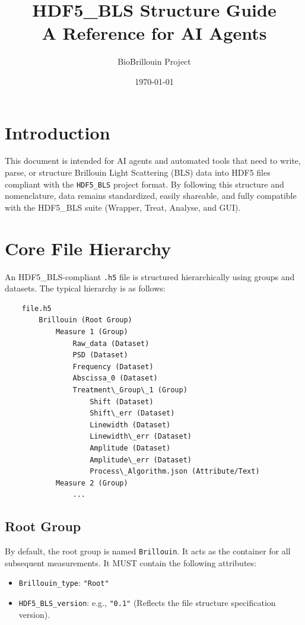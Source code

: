 \documentclass{article}
\title{HDF5\_BLS Structure Guide \\ \large A Reference for AI Agents}
\author{BioBrillouin Project}
\date{\today}
\begin{document}
\maketitle

\section{Introduction}
This document is intended for AI agents and automated tools that need to write, parse, or structure Brillouin Light Scattering (BLS) data into HDF5 files compliant with the \texttt{HDF5\_BLS} project format. By following this structure and nomenclature, data remains standardized, easily shareable, and fully compatible with the HDF5\_BLS suite (Wrapper, Treat, Analyse, and GUI).

\section{Core File Hierarchy}
An HDF5\_BLS-compliant \texttt{.h5} file is structured hierarchically using groups and datasets. The typical hierarchy is as follows:

\begin{verbatim}
    file.h5
        Brillouin (Root Group)
            Measure 1 (Group)
                Raw_data (Dataset)
                PSD (Dataset)
                Frequency (Dataset)
                Abscissa_0 (Dataset)
                Treatment\_Group\_1 (Group)
                    Shift (Dataset)
                    Shift\_err (Dataset)
                    Linewidth (Dataset)
                    Linewidth\_err (Dataset)
                    Amplitude (Dataset)
                    Amplitude\_err (Dataset)
                    Process\_Algorithm.json (Attribute/Text)
            Measure 2 (Group)
                ...
\end{verbatim}

\subsection{Root Group}
By default, the root group is named \texttt{Brillouin}. It acts as the container for all subsequent measurements.
It MUST contain the following attributes:
\begin{itemize}
    \item \texttt{Brillouin\_type}: \texttt{"Root"}
    \item \texttt{HDF5\_BLS\_version}: e.g., \texttt{"0.1"} (Reflects the file structure specification version).
\end{itemize}
\end{document}
